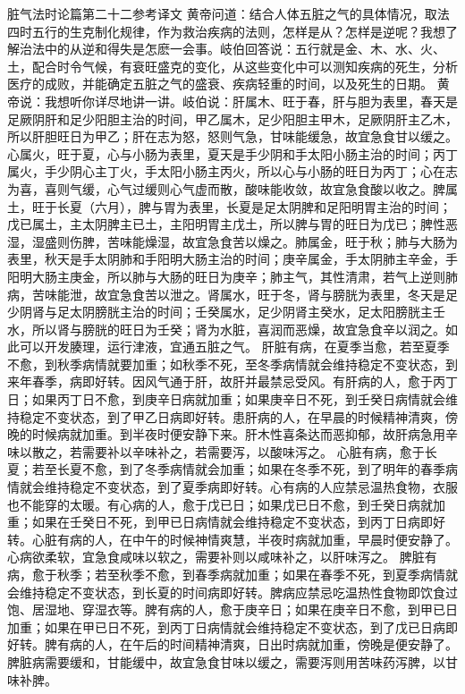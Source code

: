 \documentclass[a4paper,12pt,UTF8,twoside]{ctexbook}
\begin{document}
脏气法时论篇第二十二参考译文
黄帝问道：结合人体五脏之气的具体情况，取法四时五行的生克制化规律，作为救治疾病的法则，怎样是从？怎样是逆呢？我想了解治法中的从逆和得失是怎麽一会事。岐伯回答说：五行就是金、木、水、火、土，配合时令气候，有衰旺盛克的变化，从这些变化中可以测知疾病的死生，分析医疗的成败，并能确定五脏之气的盛衰、疾病轻重的时间，以及死生的日期。
黄帝说：我想听你详尽地讲一讲。岐伯说：肝属木、旺于春，肝与胆为表里，春天是足厥阴肝和足少阳胆主治的时间，甲乙属木，足少阳胆主甲木，足厥阴肝主乙木，所以肝胆旺日为甲乙；肝在志为怒，怒则气急，甘味能缓急，故宜急食甘以缓之。心属火，旺于夏，心与小肠为表里，夏天是手少阴和手太阳小肠主治的时间；丙丁属火，手少阴心主丁火，手太阳小肠主丙火，所以心与小肠的旺日为丙丁；心在志为喜，喜则气缓，心气过缓则心气虚而散，酸味能收敛，故宜急食酸以收之。脾属土，旺于长夏（六月），脾与胃为表里，长夏是足太阴脾和足阳明胃主治的时间；戊已属土，主太阴脾主已土，主阳明胃主戊土，所以脾与胃的旺日为戊已；脾性恶湿，湿盛则伤脾，苦味能燥湿，故宜急食苦以燥之。肺属金，旺于秋；肺与大肠为表里，秋天是手太阴肺和手阳明大肠主治的时间；庚辛属金，手太阴肺主辛金，手阳明大肠主庚金，所以肺与大肠的旺日为庚辛；肺主气，其性清肃，若气上逆则肺病，苦味能泄，故宜急食苦以泄之。肾属水，旺于冬，肾与膀胱为表里，冬天是足少阴肾与足太阴膀胱主治的时间；壬癸属水，足少阴肾主癸水，足太阳膀胱主壬水，所以肾与膀胱的旺日为壬癸；肾为水脏，喜润而恶燥，故宜急食辛以润之。如此可以开发腠理，运行津液，宜通五脏之气。
肝脏有病，在夏季当愈，若至夏季不愈，到秋季病情就要加重；如秋季不死，至冬季病情就会维持稳定不变状态，到来年春季，病即好转。因风气通于肝，故肝并最禁忌受风。有肝病的人，愈于丙丁日；如果丙丁日不愈，到庚辛日病就加重；如果庚辛日不死，到壬癸日病情就会维持稳定不变状态，到了甲乙日病即好转。患肝病的人，在早晨的时候精神清爽，傍晚的时候病就加重。到半夜时便安静下来。肝木性喜条达而恶抑郁，故肝病急用辛味以散之，若需要补以辛味补之，若需要泻，以酸味泻之。
心脏有病，愈于长夏；若至长夏不愈，到了冬季病情就会加重；如果在冬季不死，到了明年的春季病情就会维持稳定不变状态，到了夏季病即好转。心有病的人应禁忌温热食物，衣服也不能穿的太暖。有心病的人，愈于戊已日；如果戊已日不愈，到壬癸日病就加重；如果在壬癸日不死，到甲已日病情就会维持稳定不变状态，到丙丁日病即好转。心脏有病的人，在中午的时候神情爽慧，半夜时病就加重，早晨时便安静了。心病欲柔软，宜急食咸味以软之，需要补则以咸味补之，以肝味泻之。
脾脏有病，愈于秋季；若至秋季不愈，到春季病就加重；如果在春季不死，到夏季病情就会维持稳定不变状态，到长夏的时间病即好转。脾病应禁忌吃温热性食物即饮食过饱、居湿地、穿湿衣等。脾有病的人，愈于庚辛日；如果在庚辛日不愈，到甲已日加重；如果在甲已日不死，到丙丁日病情就会维持稳定不变状态，到了戊已日病即好转。脾有病的人，在午后的时间精神清爽，日出时病就加重，傍晚是便安静了。脾脏病需要缓和，甘能缓中，故宜急食甘味以缓之，需要泻则用苦味药泻脾，以甘味补脾。
\end{document}

